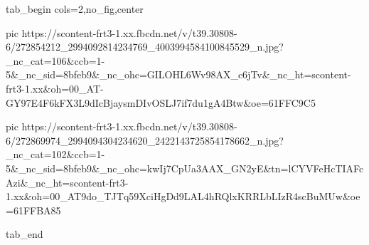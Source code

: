  
 
 
 
 


\ifcmt
  tab_begin cols=2,no_fig,center

     pic https://scontent-frt3-1.xx.fbcdn.net/v/t39.30808-6/272854212_2994092814234769_4003994584100845529_n.jpg?_nc_cat=106&ccb=1-5&_nc_sid=8bfeb9&_nc_ohc=GILOHL6Wv98AX_c6jTv&_nc_ht=scontent-frt3-1.xx&oh=00_AT-GY97E4F6kFX3L9dIcBjaysmDIvOSLJ7if7du1gA4Btw&oe=61FFC9C5

     pic https://scontent-frt3-1.xx.fbcdn.net/v/t39.30808-6/272869974_2994094304234620_2422143725854178662_n.jpg?_nc_cat=102&ccb=1-5&_nc_sid=8bfeb9&_nc_ohc=kwIj7CpUa3AAX_GN2yE&tn=lCYVFeHcTIAFcAzi&_nc_ht=scontent-frt3-1.xx&oh=00_AT9do_TJTq59XciHgDd9LAL4hRQlxKRRLbLIzR4scBuMUw&oe=61FFBA85

  tab_end
\fi
